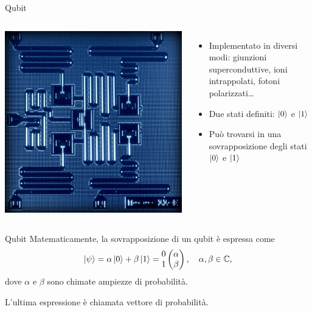 \documentclass{beamer}
\begin{document}
    \begin{frame}{Qubit}
        \begin{columns}
            \includegraphics[width=\textwidth]{gfx/qubit}
            \begin{itemize}
                \item Implementato in diversi modi: giunzioni superconduttive, ioni intrappolati, fotoni polarizzati\ldots
                \item Due stati definiti: $\ket{0}$ e $\ket{1}$
                \item Può trovarsi in una sovrapposizione degli stati $\ket{0}$ e $\ket{1}$
            \end{itemize}
        \end{columns}
    \end{frame}

    \begin{frame}{Qubit}
        Matematicamente, la sovrapposizione di un qubit è espressa come
        \begin{equation*}
            \ket{\psi} = \alpha \ket{0} + \beta \ket{1} = \begin{matrix}
                0 \\ 1
            \end{matrix}\begin{pmatrix}
                \alpha \\ \beta
            \end{pmatrix}
            , \quad \alpha, \beta \in \mathbb{C}, 
        \end{equation*}
        dove $\alpha$ e $\beta$ sono chimate ampiezze di probabilità. 
        
        L'ultima espressione è chiamata vettore di probabilità. 
    \end{frame}
\end{document}
